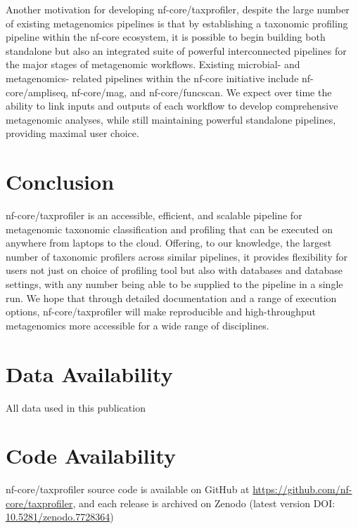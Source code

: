 \documentclass[
]{article}
\begin{document}
Another motivation for developing nf-core/taxprofiler, despite the large
number of existing metagenomics pipelines is that by establishing a
taxonomic profiling pipeline within the nf-core ecosystem, it is
possible to begin building both standalone but also an integrated suite
of powerful interconnected pipelines for the major stages of metagenomic
workflows. Existing microbial- and metagenomics- related pipelines
within the nf-core initiative include nf-core/ampliseq, nf-core/mag, and
nf-core/funcscan. We expect over time the ability to link inputs and
outputs of each workflow to develop comprehensive metagenomic analyses,
while still maintaining powerful standalone pipelines, providing maximal
user choice.

\hypertarget{conclusion}{%
\section{Conclusion}\label{conclusion}}

nf-core/taxprofiler is an accessible, efficient, and scalable pipeline
for metagenomic taxonomic classification and profiling that can be
executed on anywhere from laptops to the cloud. Offering, to our
knowledge, the largest number of taxonomic profilers across similar
pipelines, it provides flexibility for users not just on choice of
profiling tool but also with databases and database settings, with any
number being able to be supplied to the pipeline in a single run. We
hope that through detailed documentation and a range of execution
options, nf-core/taxprofiler will make reproducible and high-throughput
metagenomics more accessible for a wide range of disciplines.

\hypertarget{data-availability}{%
\section{Data Availability}\label{data-availability}}

All data used in this publication

\hypertarget{code-availability}{%
\section{Code Availability}\label{code-availability}}

nf-core/taxprofiler source code is available on GitHub at
\url{https://github.com/nf-core/taxprofiler}, and each release is
archived on Zenodo (latest version DOI:
\href{https://doi.org/10.5281/zenodo.7728364}{10.5281/zenodo.7728364})
\end{document}
